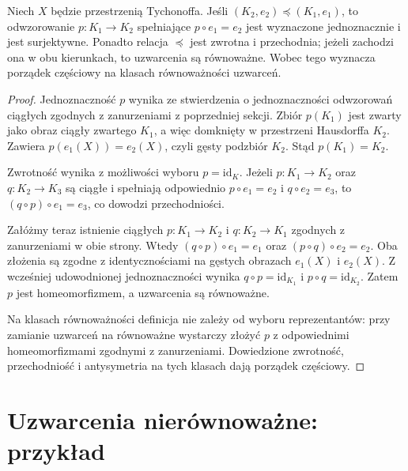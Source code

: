 \begin{stwierdzenie}
\label{prop:topog-uzwarcenia-porzadek-klasy}
Niech $X$ będzie przestrzenią Tychonoffa.
Jeśli $(K_2,e_2)\preccurlyeq(K_1,e_1)$,
to odwzorowanie $p\colon K_1\to K_2$
spełniające $p\circ e_1=e_2$
jest wyznaczone jednoznacznie
i jest surjektywne.
Ponadto relacja $\preccurlyeq$
jest zwrotna i przechodnia;
jeżeli zachodzi ona w obu kierunkach,
to uzwarcenia są równoważne.
Wobec tego wyznacza porządek częściowy
na klasach równoważności uzwarceń.
\end{stwierdzenie}
\begin{proof}
Jednoznaczność $p$ wynika ze
stwierdzenia o jednoznaczności
odwzorowań ciągłych zgodnych
z zanurzeniami z poprzedniej sekcji.
Zbiór $p(K_1)$ jest zwarty jako obraz
ciągły zwartego $K_1$, a więc
domknięty w przestrzeni Hausdorffa $K_2$.
Zawiera $p(e_1(X))=e_2(X)$,
czyli gęsty podzbiór $K_2$.
Stąd $p(K_1)=K_2$.

Zwrotność wynika z możliwości
wyboru $p=\mathrm{id}_{K}$.
Jeżeli $p\colon K_1\to K_2$
oraz $q\colon K_2\to K_3$
są ciągłe i spełniają odpowiednio
$p\circ e_1=e_2$ i $q\circ e_2=e_3$,
to $(q\circ p)\circ e_1=e_3$,
co dowodzi przechodniości.

Załóżmy teraz istnienie
ciągłych $p\colon K_1\to K_2$
i $q\colon K_2\to K_1$ zgodnych
z zanurzeniami w obie strony.
Wtedy
$(q\circ p)\circ e_1=e_1$
oraz $(p\circ q)\circ e_2=e_2$.
Oba złożenia są zgodne z identycznościami
na gęstych obrazach $e_1(X)$ i $e_2(X)$.
Z wcześniej udowodnionej jednoznaczności
wynika $q\circ p=\mathrm{id}_{K_1}$
i $p\circ q=\mathrm{id}_{K_2}$.
Zatem $p$ jest homeomorfizmem,
a uzwarcenia są równoważne.

Na klasach równoważności definicja
nie zależy od wyboru reprezentantów:
przy zamianie uzwarceń na równoważne
wystarczy złożyć $p$ z odpowiednimi
homeomorfizmami zgodnymi z zanurzeniami.
Dowiedzione zwrotność, przechodniość
i antysymetria na tych klasach
dają porządek częściowy.
\end{proof}

\section{Uzwarcenia nierównoważne: przykład}
\label{sec:topog-uzwarcenia-przyklady}

